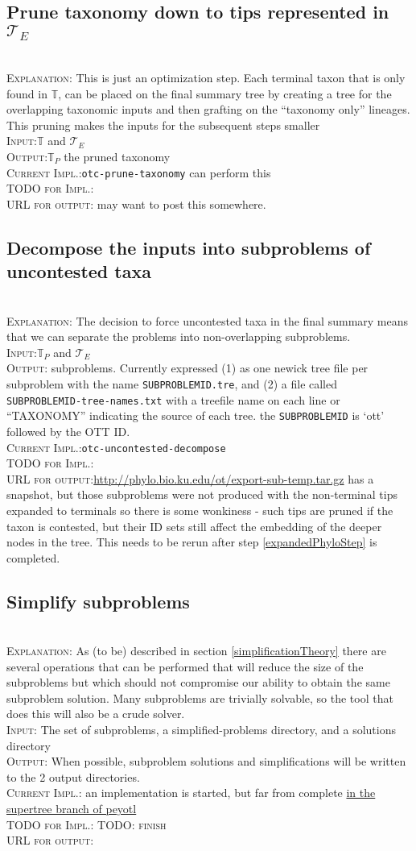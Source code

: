 \documentclass[11pt]{article}
\newcommand{\otcprune}[0]{\texttt{otc-prune-taxonomy}\xspace}
\newcommand{\otcdecompose}[0]{\texttt{otc-uncontested-decompose}\xspace}
\newcommand{\stepExplanation}[0]{\\\noindent\textsc{Explanation}:\xspace}
\newcommand{\stepInput}[0]{\\\noindent\textsc{Input}:\xspace}
\newcommand{\stepOutput}[0]{\\\noindent\textsc{Output}:\xspace}
\newcommand{\currImpl}[0]{\\\noindent\textsc{Current Impl.}:\xspace}
\newcommand{\implTODO}[0]{\\\noindent\textsc{TODO for Impl.}:\xspace}
\newcommand{\currURL}[0]{\\\noindent\textsc{URL for output}:\xspace}
\newcommand{\comment}[1]{{\color{red} \textsc{#1}}\xspace}
\newcommand{\TODO}[1]{\comment{TODO: #1}}
\newcommand{\taxonomy}[0]{\ensuremath{\mathbb{T}}\xspace}
\newcommand{\prunedTaxonomy}[0]{\ensuremath{\mathbb{T}_P}\xspace}
\newcommand{\expandedPhylo}[0]{\ensuremath{\mathcal{T}_{E}}\xspace}
\begin{document}
\subsection{Prune taxonomy down to tips represented in \expandedPhylo}\label{prunedTaxonomyStep}
\stepExplanation This is just an optimization step.
Each terminal taxon that is only found in \taxonomy, can be placed on the 
    final summary tree by creating a tree for the overlapping taxonomic
    inputs and then grafting on the ``taxonomy only'' lineages.
This pruning makes the inputs for the subsequent steps smaller
\stepInput \taxonomy and \expandedPhylo
\stepOutput \prunedTaxonomy the pruned taxonomy
\currImpl \otcprune can perform this
\implTODO
\currURL may want to post this somewhere. 

\subsection{Decompose the inputs into subproblems of uncontested taxa}\label{decomposeStep}
\stepExplanation The decision to force uncontested taxa in the final
    summary means that we can separate the problems into non-overlapping
    subproblems.
\stepInput \prunedTaxonomy and \expandedPhylo
\stepOutput subproblems. Currently expressed (1) as one newick tree file  per subproblem
    with the name \texttt{SUBPROBLEMID.tre}, and
    (2) a file called \texttt{SUBPROBLEMID-tree-names.txt} with a treefile name 
    on each line or ``TAXONOMY'' indicating the source of each tree. 
    the \texttt{SUBPROBLEMID} is `ott' followed by the OTT ID.
\currImpl \otcdecompose
\implTODO 
\currURL \url{http://phylo.bio.ku.edu/ot/export-sub-temp.tar.gz} has a snapshot, but
those subproblems were not produced with the non-terminal tips expanded to terminals
so there is some wonkiness - such tips are pruned if the taxon is contested, but their
ID sets still affect the embedding of the deeper nodes in the tree. This needs 
to be rerun after step \ref{expandedPhyloStep} is completed.
 
\subsection{Simplify subproblems}\label{simplifyStep}
\stepExplanation As (to be) described in section \ref{simplificationTheory} there
    are several operations that can be performed that will reduce the size of the
    subproblems but which should not compromise our ability to obtain the same
    subproblem solution.
    Many subproblems are trivially solvable, so the tool that does this
    will also be a crude solver.
\stepInput The set of subproblems, a simplified-problems directory, and a solutions directory
\stepOutput When possible, subproblem solutions and simplifications will be written to the 2 output directories.
\currImpl an implementation is started, but far from complete \href{https://github.com/OpenTreeOfLife/peyotl/blob/supertree/scripts/supertree/simplify_subproblems.py}{in the supertree branch of peyotl}
\implTODO \TODO {finish}
\currURL 
 
\end{document}
